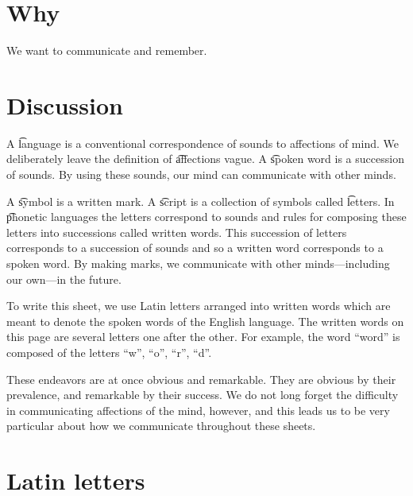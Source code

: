 

\section*{Why}

We want to communicate and remember.

\section*{Discussion}

A \t{language} is a conventional correspondence of sounds to affections of mind.
We deliberately leave the definition of \t{affections} vague.
A \t{spoken word} is a succession of sounds.
By using these sounds, our mind can communicate with other minds.

A \t{symbol} is a written mark.
A \t{script} is a collection of symbols called \t{letters}.
In \t{phonetic} languages the letters correspond to sounds and rules for composing these letters into successions called written words.
This succession of letters corresponds to a succession of sounds and so a written word corresponds to a spoken word.
By making marks, we communicate with other minds---including our own---in the future.

To write this sheet, we use Latin letters arranged into written words which are meant to denote the spoken words of the English language.
The written words on this page are several letters one after the other.
For example, the word ``word'' is composed of the letters ``w'', ``o'', ``r'', ``d''.

These endeavors are at once obvious and remarkable.
They are obvious by their prevalence, and remarkable by their success.
We do not long forget the difficulty in communicating affections of the mind, however, and this leads us to be very particular about how we communicate throughout these sheets.

\section*{Latin letters}

